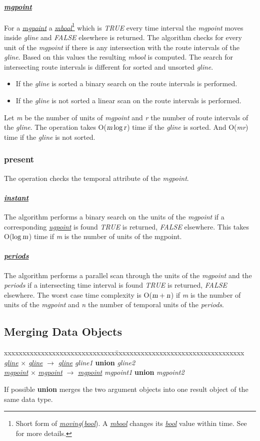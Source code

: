 \documentclass[a4paper]{article}
\newcommand{\op}[1]{\textbf{#1}}
\newcommand{\var}[1]{\textsl{#1}}
\newcommand{\dt}[1]{\textsl{\underline{#1}}}
\newcommand{\true}{\var{TRUE}}
\newcommand{\false}{\var{FALSE}}
\begin{document}
\paragraph{\dt{mgpoint}}
For a \dt{mgpoint} a \dt{mbool}\footnote{Short form of \dt{moving}(\dt{bool}). A \dt{mbool} changes its \dt{bool} value within time. See \cite{594784} for more details.} which is \true{} every time interval the \var{mgpoint} moves inside \var{gline} and \false{} elsewhere is returned. The algorithm checks for every unit of the \var{mgpoint} if there is any intersection with the route intervals of the \var{gline}. Based on this values the resulting \var{mbool} is computed. The search for intersecting route intervals is different for sorted and unsorted \var{gline}.
\begin{itemize}
\item If the \var{gline} is sorted a binary search on the route intervals is performed.
\item If the \var{gline} is not sorted a linear scan on the route intervals is performed.
\end{itemize}
Let \var{m} be the number of units of \var{mgpoint} and \var{r} the number of route intervals of the \var{gline}. The operation takes O($\var{m} \log \var{r}$) time if the \var{gline} is sorted. And O(\var{mr}) time if the \var{gline} is not sorted.
\subsubsection{\op{present}}
The operation checks the temporal attribute of the \var{mgpoint}.
\paragraph{\dt{instant}}
The algorithm performs a binary search on the units of the \var{mgpoint} if a corresponding \dt{ugpoint} is found \true{} is returned, \false{} elsewhere. This takes O($\log \var{m}$) time if \var{m} is the number of units of the mgpoint.
\paragraph{\dt{periods}}
The algorithm performs a parallel scan through the units of the \var{mgpoint} and the \var{periods} if a intersecting time interval is found \true{} is returned, \false{} elsewhere. The worst case time complexity is O($\var{m} + \var{n}$) if \var{m} is the number of units of the  \var{mgpoint} and \var{n} the number of temporal units of the \var{periods}.
\subsection{Merging Data Objects}
\begin{tabbing}
xxxxxxxxxxxxxxxxxxxxxxxxxxxxxx\=xxxxxxxxxxxxxxxxxxxxxxxxxxxxxxxxxxx\kill
\dt{gline} $\times$ \dt{gline} $\rightarrow$ \dt{gline} \> \var{gline1} \op{union} \var{gline2} \\
\dt{mgpoint} $\times$ \dt{mgpoint} $\rightarrow$ \dt{mgpoint} \> \var{mgpoint1} \op{union} \var{mgpoint2}\\
\end{tabbing}
If possible \op{union} merges the two argument objects into one result object of the same data type.
\end{document}
